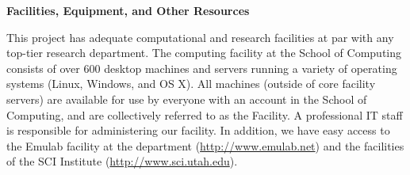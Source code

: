 \documentclass[palatinofont12,sfsectionfont]{nsfprop}
\begin{document}
\begin{center}
  \begin{Large}
    \begin{sf}
\textbf{Facilities, Equipment, and Other Resources}
    \end{sf}
  \end{Large}
\end{center}


This project has adequate computational and research facilities at par with any
top-tier research department.
%
The computing facility at the School of Computing consists of over 600 desktop
machines and servers running a variety of operating systems (Linux, Windows, and
OS X).
%
All machines (outside of core facility servers) are available for use by
everyone with an account in the School of Computing, and are collectively
referred to as the Facility.
%
A professional IT staff is responsible for administering our facility.
%
In addition, we have easy access to the Emulab facility at the department
(\url{http://www.emulab.net}) and the facilities of the SCI Institute
(\url{http://www.sci.utah.edu}).
\end{document}
